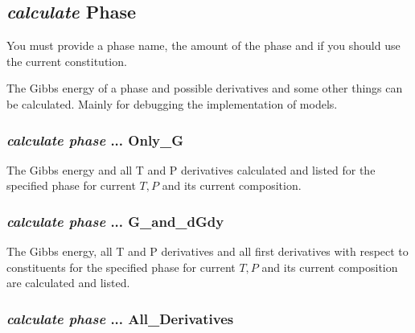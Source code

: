 \documentclass[12pt]{article}
\begin{document}
\subsection{{\em calculate} Phase}

You must provide a phase name, the amount of the phase and if you
should use the current constitution.

The Gibbs energy of a phase and possible derivatives and some other
things can be calculated.  Mainly for debugging the implementation of
models.

\subsubsection{{\em calculate phase} ... Only\_G}

The Gibbs energy and all T and P derivatives calculated and listed for
the specified phase for current $T,P$ and its current composition.

\subsubsection{{\em calculate phase} ... G\_and\_dGdy}

The Gibbs energy, all T and P derivatives and all first derivatives
with respect to constituents for the specified phase for current $T,P$
and its current composition are calculated and listed.

\subsubsection{{\em calculate phase} ... All\_Derivatives}
\end{document}
